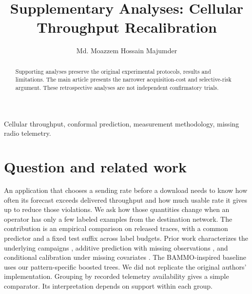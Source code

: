 \documentclass[journal,onecolumn,10pt]{IEEEtran}
\begin{document}
\title{Supplementary Analyses: Cellular Throughput Recalibration}
\author{Md. Moazzem Hossain Majumder}
\maketitle
\begin{abstract}Supporting analyses preserve the original experimental protocols, results and limitations. The main article presents the narrower acquisition-cost and selective-risk argument. These retrospective analyses are not independent confirmatory trials.\end{abstract}
\begin{IEEEkeywords}
Cellular throughput, conformal prediction, measurement methodology, missing radio telemetry.
\end{IEEEkeywords}

\section{Question and related work}
An application that chooses a sending rate before a download needs to know how often its forecast exceeds delivered throughput and how much usable rate it gives up to reduce those violations. We ask how those quantities change when an operator has only a few labeled examples from the destination network. The contribution is an empirical comparison on released traces, with a common predictor and a fixed test suffix across label budgets. Prior work characterizes the underlying campaigns \cite{kousias2024data,caso2024}, additive prediction with missing observations \cite{jacobson2025}, and conditional calibration under missing covariates \cite{zaffran2023}. The BAMMO-inspired baseline uses our pattern-specific boosted trees. We did not replicate the original authors' implementation. Grouping by recorded telemetry availability gives a simple comparator. Its interpretation depends on support within each group.
\end{document}
